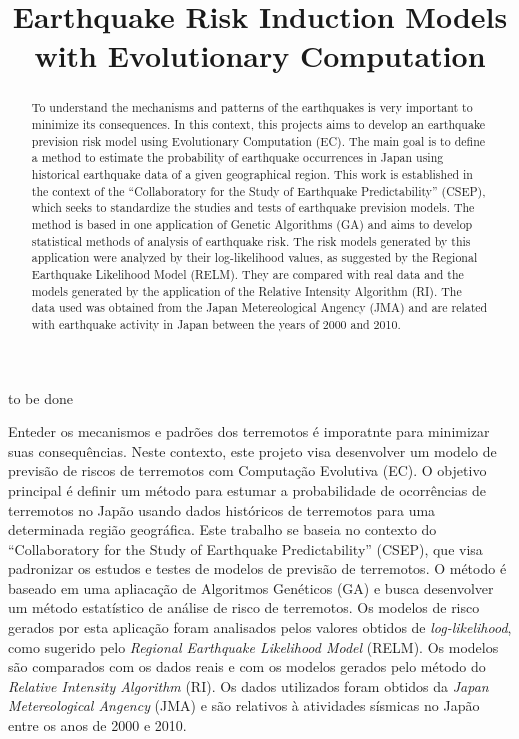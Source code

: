 \documentclass[bacharelado]{unb-cic}
\title{Earthquake Risk Induction Models with Evolutionary Computation}
\begin{document}
  \maketitle
  \pretextual

  \begin{agradecimentos}
  to be done
  \end{agradecimentos}
  \begin{resumo}
  Enteder os mecanismos e padrões dos terremotos é imporatnte para minimizar suas consequências. Neste contexto, este projeto visa desenvolver um modelo de previsão de riscos de terremotos com Computação Evolutiva (EC). O objetivo principal é definir um método para estumar a probabilidade de ocorrências de terremotos no Japão usando dados históricos de terremotos para uma determinada região geográfica. Este trabalho se baseia no contexto do  “Collaboratory for the Study of Earthquake Predictability” (CSEP), que visa padronizar os estudos e testes de modelos de previsão de terremotos. O método é baseado em uma apliacação de Algoritmos Genéticos (GA) e busca desenvolver um método estatístico de análise de risco de terremotos. Os modelos de risco gerados por esta aplicação foram analisados pelos valores obtidos de {\it log-likelihood}, como sugerido pelo {\it Regional Earthquake Likelihood Model} (RELM). Os modelos são comparados com os dados reais e com os modelos gerados pelo método do {\it Relative Intensity Algorithm} (RI). Os dados utilizados foram obtidos da {\it Japan Metereological Angency} (JMA) e são relativos à atividades sísmicas no Japão entre os anos de 2000 e 2010.
  \end{resumo}

  \begin{abstract}	
To understand the mechanisms and patterns of the earthquakes is very important to minimize its consequences. In this context, this projects aims to develop an earthquake prevision risk model using Evolutionary Computation (EC). The main goal is to define a method to estimate the probability of earthquake occurrences in Japan using historical earthquake data of a given geographical region. This work is established in the context of the “Collaboratory for the Study of Earthquake Predictability” (CSEP), which seeks to standardize the studies and tests of earthquake prevision models. The method is based in one application of Genetic Algorithms (GA) and aims to develop statistical methods of analysis of earthquake risk. The risk models generated by this application were analyzed by their log-likelihood values, as suggested by the Regional Earthquake Likelihood Model (RELM). They are compared with real data and the models generated by the application of the Relative Intensity Algorithm (RI). The data used was obtained from the Japan Metereological Angency (JMA) and are related with earthquake activity in Japan between the years of 2000 and 2010.
  \end{abstract}
\end{document}
